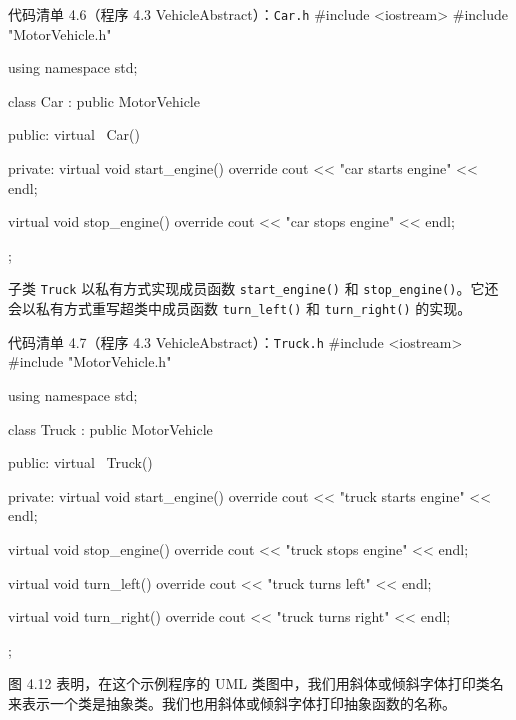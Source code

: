 \begin{codeboxt}{代码清单 4.6（程序 4.3 VehicleAbstract）：\texttt{Car.h}}
#include <iostream>
#include "MotorVehicle.h"

using namespace std;

class Car : public MotorVehicle
{
public:
    virtual ~Car() {}

private:
    virtual void start_engine() override
    {
        cout << "car starts engine" << endl;
    }

    virtual void stop_engine() override
    {
        cout << "car stops engine" << endl;
    }
};
\end{codeboxt}

子类 \texttt{Truck} 以私有方式实现成员函数 \texttt{start\_\allowbreak{}engine(\allowbreak{})\allowbreak{}} 和 \texttt{stop\_\allowbreak{}engine(\allowbreak{})\allowbreak{}}。它还会以私有方式重写超类中成员函数 \texttt{turn\_\allowbreak{}left(\allowbreak{})\allowbreak{}} 和 \texttt{turn\_\allowbreak{}right(\allowbreak{})\allowbreak{}} 的实现。

\begin{codeboxt}{代码清单 4.7（程序 4.3 VehicleAbstract）：\texttt{Truck.h}}
#include <iostream>
#include "MotorVehicle.h"

using namespace std;

class Truck : public MotorVehicle
{
public:
    virtual ~Truck() {}

private:
    virtual void start_engine() override
    {
        cout << "truck starts engine" << endl;
    }

    virtual void stop_engine() override
    {
        cout << "truck stops engine" << endl;
    }

    virtual void turn_left() override
    {
        cout << "truck turns left" << endl;
    }

    virtual void turn_right() override
    {
        cout << "truck turns right" << endl;
    }
};
\end{codeboxt}

图 4.12 表明，在这个示例程序的 UML 类图中，我们用斜体或倾斜字体打印类名来表示一个类是抽象类。我们也用斜体或倾斜字体打印抽象函数的名称。


